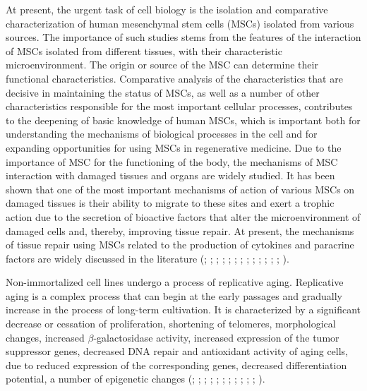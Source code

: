 \documentclass[english,authoryear]{elsarticle}
\begin{document}
At present, the urgent task of cell biology is the isolation and comparative characterization of human mesenchymal stem cells (MSCs) isolated from various sources.
The importance of such studies stems from the features of the interaction of MSCs isolated from different tissues, with their characteristic microenvironment.
The origin or source of the MSC can determine their functional characteristics.
Comparative analysis of the characteristics that are decisive in maintaining the status of MSCs, as well as a number of other characteristics responsible for the most important cellular processes, contributes to the deepening of basic knowledge of human MSCs, which is important both for understanding the mechanisms of biological processes in the cell and for expanding opportunities for using MSCs in regenerative medicine.
Due to the importance of MSC for the functioning of the body, the mechanisms of MSC interaction with damaged tissues and organs are widely studied.
It has been shown that one of the most important mechanisms of action of various MSCs on damaged tissues is their ability to migrate to these sites and exert a trophic action due to the secretion of bioactive factors that alter the microenvironment of damaged cells and, thereby, improving tissue repair.
At present, the mechanisms of tissue repair using MSCs related to the production of cytokines and paracrine factors are widely discussed in the literature (\cite{phinney2007concise}; \cite{m2011mesenchymal}; \cite{guiducci2011bone}; \cite{gruenloh2011characterization}; \cite{huang2013effects}; \cite{luo2013mesenchymal}; \cite{ando2014stem}; \cite{hendijani2015human}; \cite{hendijani2015effect}; \cite{danieli2016testing}; \cite{julianto2016topical}; \cite{teixeira2017impact}; \cite{vulcano2016wharton}; \cite{zachar2016activation}).


Non-immortalized cell lines undergo a process of replicative aging.
Replicative aging is a complex process that can begin at the early passages and gradually increase in the process of long-term cultivation.
It is characterized by a significant decrease or cessation of proliferation, shortening of telomeres, morphological changes, increased $\beta$-galactosidase activity, increased expression of the tumor suppressor genes, decreased DNA repair and antioxidant activity of aging cells, due to reduced expression of the corresponding genes, decreased differentiation potential, a number of epigenetic changes (\cite{wagner2008replicative}; \cite{kuilman2010essence}; \cite{redaelli2012cytogenomic}; \cite{estrada2013human}; \cite{savickiene2016senescence}; \cite{danisovic2017effect}; \cite{koltsova2018dynamics}; \cite{alessio2018mesenchymal}; \cite{krylova2018isolation}; \cite{niedernhofer2018nuclear}; \cite{truong2018characterization}; \cite{yu2018replicative}).
\end{document}
